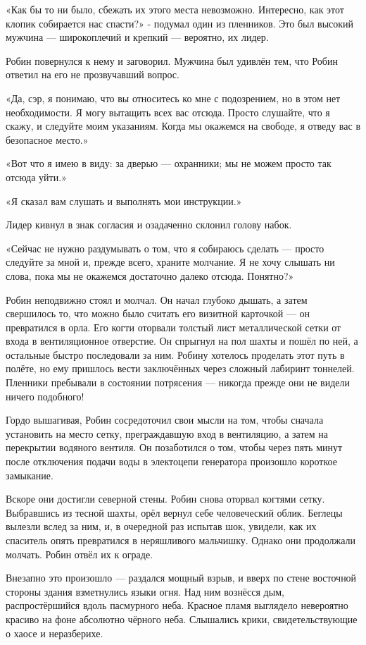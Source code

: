 \documentclass[a5paper, 9pt,
final, openany, twoside=true]{memoir}
\begin{document}
«Как бы то ни было, сбежать их этого места невозможно. Интересно, как этот клопик собирается нас спасти?» - подумал один из пленников. Это был высокий мужчина — широкоплечий и крепкий — вероятно, их лидер.

Робин повернулся к нему и заговорил. Мужчина был удивлён тем, что Робин ответил на его не прозвучавший вопрос.

«Да, сэр, я понимаю, что вы относитесь ко мне с подозрением, но в этом нет необходимости. Я могу вытащить всех вас отсюда. Просто слушайте, что я скажу, и следуйте моим указаниям. Когда мы окажемся на свободе, я отведу вас в безопасное место.»

«Вот что я имею в виду: за дверью — охранники; мы не можем просто так отсюда уйти.»

«Я сказал вам слушать и выполнять мои инструкции.»

Лидер кивнул в знак согласия и озадаченно склонил голову набок.

«Сейчас не нужно раздумывать о том, что я собираюсь сделать — просто следуйте за мной и, прежде всего, храните молчание. Я не хочу слышать ни слова, пока мы не окажемся достаточно далеко отсюда. Понятно?»\bigskip

Робин неподвижно стоял и молчал. Он начал глубоко дышать, а затем свершилось то, что можно было считать его визитной карточкой — он превратился в орла. Его когти оторвали толстый лист металлической сетки от входа в вентиляционное отверстие. Он спрыгнул на пол шахты и пошёл по ней, а остальные быстро последовали за ним. Робину хотелось проделать этот путь в полёте, но ему пришлось вести заключённых через сложный лабиринт тоннелей. Пленники пребывали в состоянии потрясения — никогда прежде они не видели ничего подобного!

Гордо вышагивая, Робин сосредоточил свои мысли на том, чтобы сначала установить на место сетку, преграждавшую вход в вентиляцию, а затем на перекрытии водяного вентиля. Он позаботился о том, чтобы через пять минут после отключения подачи воды в электоцепи генератора произошло короткое замыкание.

Вскоре они достигли северной стены. Робин снова оторвал когтями сетку. Выбравшись из тесной шахты, орёл вернул себе человеческий облик. Беглецы вылезли вслед за ним, и, в очередной раз испытав шок, увидели, как их спаситель опять превратился в неряшливого мальчишку. Однако они продолжали молчать. Робин отвёл их к ограде.

Внезапно это произошло — раздался мощный взрыв, и вверх по стене восточной стороны здания взметнулись языки огня. Над ним вознёсся дым, распростёршийся вдоль пасмурного неба. Красное пламя выглядело невероятно красиво на фоне абсолютно чёрного неба. Слышались крики, свидетельствующие о хаосе и неразберихе.
\end{document}
